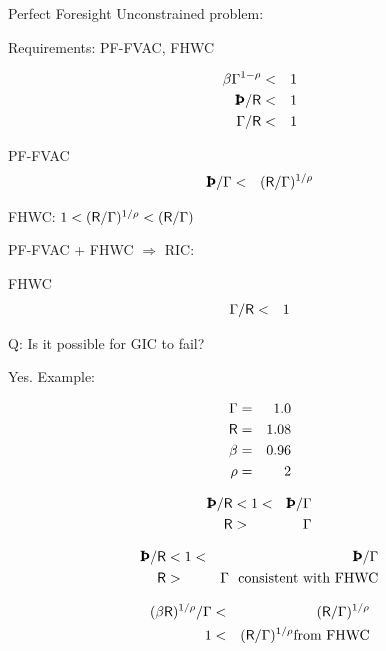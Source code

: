 \documentclass[titlepage,abstract]{bejournal}
\begin{document}
Perfect Foresight Unconstrained problem:

Requirements: PF-FVAC, FHWC

\begin{eqnarray}
    \beta \PGro^{1-\CRRA} & < & 1   \label{eq:PFFVAC}
\\  \Pat/\Rfree & < & 1 \label{eq:RIC}
\\  \PGro/\Rfree & < & 1  \label{eq:FHWC}
\end{eqnarray}

PF-FVAC
\begin{eqnarray}
  \Pat/\PGro & < & (\Rfree/\PGro)^{1/\CRRA} \label{eq:RIC}
\end{eqnarray}

FHWC: $1 < (\mathsf{R}/\Gamma)^{1/\rho} < (\mathsf{R}/\Gamma)$

PF-FVAC + FHWC $\Rightarrow$ RIC:


FHWC
\begin{eqnarray}
  \Gamma/\mathsf{R} & < & 1  \label{eq:PFFVAC}
\end{eqnarray}


Q: Is it possible for GIC to fail?

Yes.  Example:

\begin{eqnarray}
  \Gamma & = & 1.0
\\ \mathsf{R} & = & 1.08
\\ \beta  & = & 0.96
\\ \rho & = & 2
\end{eqnarray}



\begin{eqnarray}
  \label{eq:GICFails}
  \Pat/\Rfree & < 1  < & \Pat/\PGro 
\\ \Rfree & > & \PGro
\end{eqnarray}

\begin{eqnarray}
  \label{eq:GICFails}
  \Pat/\Rfree & < 1  < & \Pat/\PGro 
\\ \Rfree & > & \PGro \text{~~consistent with FHWC}
\end{eqnarray}

\begin{eqnarray}
  \label{eq:1}
  (\beta \mathsf{R})^{1/\rho}/\Gamma & < & (\mathsf{R}/\Gamma)^{1/\rho} 
\\ 1 & < &  (\mathsf{R}/\Gamma)^{1/\rho} \text{from FHWC}
\end{eqnarray}
\end{document}
